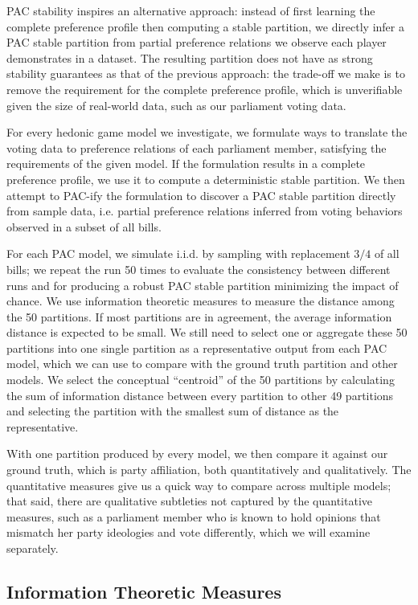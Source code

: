 PAC stability inspires an alternative approach: instead of first learning the complete preference profile then computing a stable partition, we directly
infer a PAC stable partition from partial preference relations we observe
each player demonstrates in a dataset.
The resulting partition does not have as strong stability guarantees as that
of the previous approach: the trade-off we make is to remove the requirement for
the complete preference profile, which is unverifiable given the size of
real-world data, such as our parliament voting data.

For every hedonic game model we investigate, we formulate ways to translate the
voting data to preference relations of each parliament member, satisfying the
requirements of the given model.
If the formulation results in a complete preference profile, we use it to
compute a deterministic stable partition.
We then attempt to PAC-ify the formulation to discover a PAC stable partition
directly from sample data, i.e. partial preference relations inferred from
voting behaviors observed in a subset of all bills.

For each PAC model, we simulate i.i.d. by sampling with replacement $3/4$ of
all bills; we repeat the run 50 times to evaluate the consistency between
different runs and for producing a robust PAC stable partition minimizing the
impact of chance.
We use information theoretic measures to measure the distance among the 50
partitions.
If most partitions are in agreement, the average information distance is
expected to be small.
We still need to select one or aggregate these 50 partitions into one single
partition as a representative output from each PAC model, which we can use
to compare with the ground truth partition and other models.
We select the conceptual ``centroid'' of the 50 partitions by calculating
the sum of information distance between every partition to other 49 partitions
and selecting the partition with the smallest sum of distance as the
representative.

With one partition produced by every model, we then compare it against our
ground truth, which is party affiliation, both quantitatively and qualitatively.
The quantitative measures give us a quick way to compare across multiple models;
that said, there are qualitative subtleties not captured by the quantitative
measures, such as a parliament member who is known to hold opinions that
mismatch her party ideologies and vote differently, which we will examine
separately.

\subsection{Information Theoretic Measures}
\label{subsec:information_theoretic_measures}

